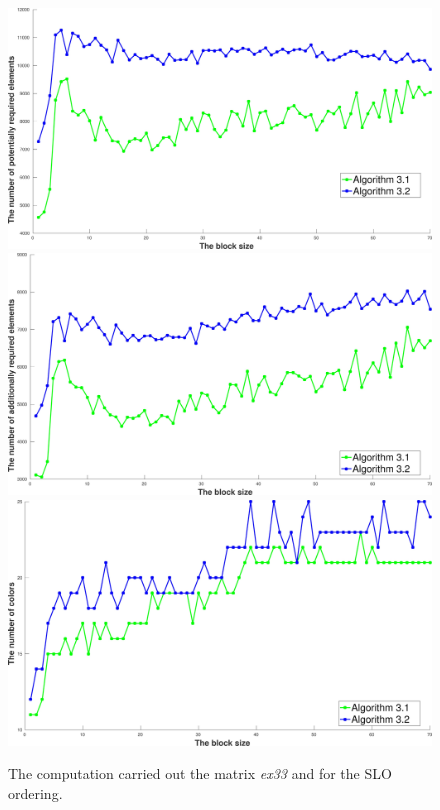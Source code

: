 \documentclass[12pt, twoside,a4paper,toc=bibliography]{scrbook}
\begin{document}
\begin{figure}
\centering
\includegraphics[width=0.75\linewidth]{ex33_alg31_alg32_bls_slo_pot}
\includegraphics[width=0.75\linewidth]{ex33_alg31_alg32_bls_slo_add}
\includegraphics[width=0.75\linewidth]{ex33_alg31_alg32_bls_slo_cols}
\caption{The computation carried  out the matrix \textit{ex33} and for the SLO ordering.}
\label{ex33_alg31_alg32_bls_slo}
\end{figure}
\end{document}
